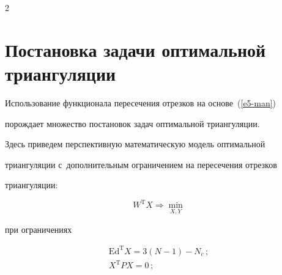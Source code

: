 \begin{multicols}{2}





\section{Постановка задачи оптимальной триангуляции}





  Использование функционала пересечения отрезков на основе~(\ref{e5-man}) 


по\-рож\-да\-ет множество по\-ста\-но\-вок задач оптимальной триангуляции.


  


  Здесь приведем перспективную математическую модель оптимальной 


триангуляции с~дополнительным ограничением на пересечения отрезков 


триангуляции:





\vspace*{2pt}





\noindent


  \begin{equation}


  W^{\mathrm{T}} X\Rightarrow \min\limits_{X,Y}


  \label{e6-man}


  \end{equation}


  


  \pagebreak


  


  \noindent


при ограничениях





\noindent


\begin{gather}


\mathrm{Ed}^{\mathrm{T}}X =3(N-1)-N_c\,;\label{e7-man}\\


X^{\mathrm{T}} P X=0\,;\label{e8-man}\\



\end{gather}
\end{multicols}
